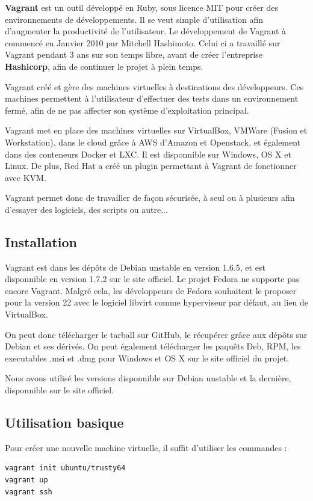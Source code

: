 \documentclass[12pt,a4paper]{article}
\begin{document}
\textbf{Vagrant} est un outil développé en Ruby, sous licence MIT pour créer des environnements de développements. Il se veut simple d'utilisation afin d'augmenter la productivité de l'utilisateur. Le développement de Vagrant à commencé en Janvier 2010 par Mitchell Hashimoto. Celui ci a travaillé sur Vagrant pendant 3 ans sur son temps libre, avant de créer l'entreprise \textbf{Hashicorp}, afin de continuer le projet à plein temps.

Vagrant créé et gère des machines virtuelles à destinations des développeurs. Ces machines permettent à l'utilisateur d'effectuer des tests dans un environnement fermé, afin de ne pas affecter son système d'exploitation principal. 

Vagrant met en place des machines virtuelles sur VirtualBox, VMWare (Fusion et Workstation), dans le cloud grâce à AWS d'Amazon et Openstack, et également dans des conteneurs Docker et LXC. Il est disponnible sur Windows, OS X et Linux. De plus, Red Hat a créé un plugin permettant à Vagrant de fonctionner avec KVM.

Vagrant permet donc de travailler de façon sécurisée, à seul ou à plusieurs afin d'essayer des logiciels, des scripts ou autre...

\subsection{Installation}
Vagrant est dans les dépôts de Debian unstable en version 1.6.5, et est disponnible en version 1.7.2 sur le site officiel. Le projet Fedora ne supporte pas encore Vagrant. Malgré cela, les développeurs de Fedora souhaitent le proposer pour la version 22 avec le logiciel libvirt comme hyperviseur par défaut, au lieu de VirtualBox.

On peut donc télécharger le tarball sur GitHub, le récupérer grâce aux dépôts sur Debian et ses dérivés. On peut également télécharger les paquêts Deb, RPM, les executables .msi et .dmg pour Windows et OS X sur le site officiel du projet.

Nous avons utilisé les versions disponnible sur Debian unstable et la dernière, disponnible sur le site officiel.

\subsection{Utilisation basique}

Pour créer une nouvelle machine virtuelle, il suffit d'utiliser les commandes :
\begin{lstlisting}
vagrant init ubuntu/trusty64
vagrant up
vagrant ssh
\end{lstlisting}
\end{document}
